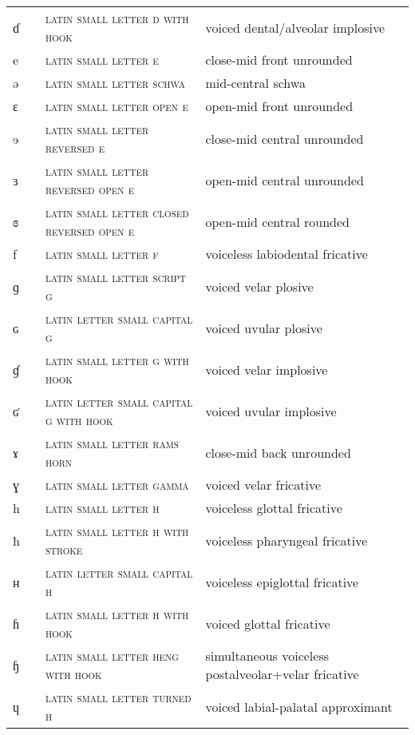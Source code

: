 \begin{center}
\begin{xtabular}{ l L{1.1cm} L{5.4cm} L{4.2cm} }
ɗ &  & \textsc{latin small letter d with hook} & voiced dental/alveolar implosive \\ 
e &  & \textsc{latin small letter e} & close-mid front unrounded \\ 
ə &  & \textsc{latin small letter schwa} & mid-central schwa \\ 
ɛ &  & \textsc{latin small letter open e} & open-mid front unrounded \\ 
ɘ &  & \textsc{latin small letter reversed e} & close-mid central unrounded \\ 
ɜ &  & \textsc{latin small letter reversed open e} & open-mid central unrounded \\ 
ɞ &  & \textsc{latin small letter closed reversed open e} & open-mid central rounded \\ 
f &  & \textsc{latin small letter f} & voiceless labiodental fricative \\ 
ɡ &  & \textsc{latin small letter script g} & voiced velar plosive \\ 
ɢ &  & \textsc{latin letter small capital g} & voiced uvular plosive \\ 
ɠ &  & \textsc{latin small letter g with hook} & voiced velar implosive \\ 
ʛ &  & \textsc{latin letter small capital g with hook} & voiced uvular implosive \\ 
ɤ &  & \textsc{latin small letter rams horn} & close-mid back unrounded \\ 
ɣ &  & \textsc{latin small letter gamma} & voiced velar fricative \\ 
h &  & \textsc{latin small letter h} & voiceless glottal fricative \\ 
ħ &  & \textsc{latin small letter h with stroke} & voiceless pharyngeal fricative \\ 
ʜ &  & \textsc{latin letter small capital h} & voiceless epiglottal fricative \\ 
ɦ &  & \textsc{latin small letter h with hook} & voiced glottal fricative \\ 
ɧ &  & \textsc{latin small letter heng with hook} & simultaneous voiceless postalveolar+velar fricative \\ 
ɥ &  & \textsc{latin small letter turned h} & voiced labial-palatal approximant \\ 

\end{xtabular}
\end{center}
